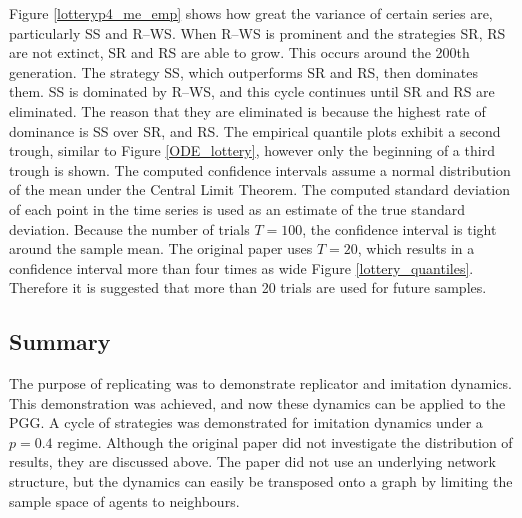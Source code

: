 \FloatBarrier
\FloatBarrier
Figure \ref{lotteryp4_me_emp} shows how great the variance of certain series are, particularly SS and R--WS. When R--WS is prominent and the strategies SR, RS are not extinct, SR and RS are able to grow. This occurs around the 200th generation. The strategy SS, which outperforms SR and RS, then dominates them. SS is dominated by R--WS, and this cycle continues until SR and RS are eliminated. The reason that they are eliminated is because the highest rate of dominance is SS over SR, and RS. The empirical quantile plots exhibit a second trough, similar to Figure \ref{ODE_lottery}, however only the beginning of a third trough is shown.  
\FloatBarrier
{}
\FloatBarrier
 The computed confidence intervals assume a normal distribution of the mean under the Central Limit Theorem. The computed standard deviation of each point in the time series is used as an estimate of the true standard deviation. Because the number of trials $T=100$, the confidence interval is tight around the sample mean. The original paper uses $T=20$, which results in a confidence interval more than four times as wide Figure \ref{lottery_quantiles}. Therefore it is suggested that more than 20 trials are used for future samples. 



\subsection{Summary}
The purpose of replicating \cite{RN30} was to demonstrate replicator and imitation dynamics. This demonstration was achieved, and now these dynamics can be applied to the PGG. A cycle of strategies was demonstrated for imitation dynamics under a $p=0.4$ regime. Although the original paper did not investigate the distribution of results, they are discussed above. The paper \cite{RN30} did not use an underlying network structure, but the dynamics can easily be transposed onto a graph by limiting the sample space of agents to neighbours. \\


